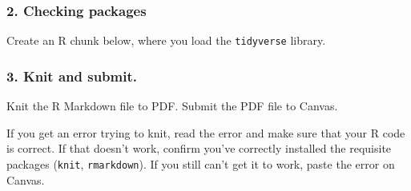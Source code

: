\documentclass[]{book}
\begin{document}
\subsubsection*{2. Checking packages}\label{checking-packages}

Create an R chunk below, where you load the \texttt{tidyverse} library.

\subsubsection*{3. Knit and submit.}\label{knit-and-submit.}

Knit the R Markdown file to PDF. Submit the PDF file to Canvas.

If you get an error trying to knit, read the error and make sure that
your R code is correct. If that doesn't work, confirm you've correctly
installed the requisite packages (\texttt{knit}, \texttt{rmarkdown}). If
you still can't get it to work, paste the error on Canvas.


\end{document}
